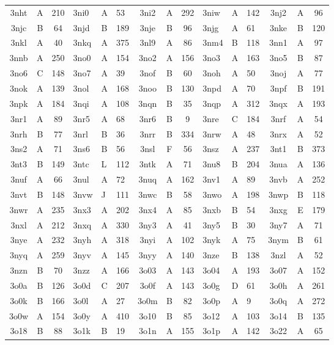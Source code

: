\begin{longtable}{|c|c|c| a|a|a| c|c|c| a|a|a| c|c|c|}
3nht & A & 210 & 3ni0 & A & 53 & 3ni2 & A & 292 & 3niw & A & 142 & 3nj2 & A & 96\\
3njc & B & 64 & 3njd & B & 189 & 3nje & B & 96 & 3njg & A & 61 & 3nke & B & 120\\
3nkl & A & 40 & 3nkq & A & 375 & 3nl9 & A & 86 & 3nm4 & B & 118 & 3nn1 & A & 97\\
3nnb & A & 250 & 3no0 & A & 154 & 3no2 & A & 156 & 3no3 & A & 163 & 3no5 & B & 87\\
3no6 & C & 148 & 3no7 & A & 39 & 3nof & B & 60 & 3noh & A & 50 & 3noj & A & 77\\
3nok & A & 139 & 3nol & A & 168 & 3noo & B & 130 & 3npd & A & 70 & 3npf & B & 191\\
3npk & A & 184 & 3nqi & A & 108 & 3nqn & B & 35 & 3nqp & A & 312 & 3nqx & A & 193\\
3nr1 & A & 89 & 3nr5 & A & 68 & 3nr6 & B & 9 & 3nre & C & 184 & 3nrf & A & 54\\
3nrh & B & 77 & 3nrl & B & 36 & 3nrr & B & 334 & 3nrw & A & 48 & 3nrx & A & 52\\
3ns2 & A & 71 & 3ns6 & B & 56 & 3nsl & F & 56 & 3nsz & A & 237 & 3nt1 & B & 373\\
3nt3 & B & 149 & 3ntc & L & 112 & 3ntk & A & 71 & 3nu8 & B & 204 & 3nua & A & 136\\
3nuf & A & 66 & 3nul & A & 72 & 3nuq & A & 162 & 3nv1 & A & 89 & 3nvb & A & 252\\
3nvt & B & 148 & 3nvw & J & 111 & 3nwc & B & 58 & 3nwo & A & 198 & 3nwp & B & 118\\
3nwr & A & 235 & 3nx3 & A & 202 & 3nx4 & A & 85 & 3nxb & B & 54 & 3nxg & E & 179\\
3nxl & A & 212 & 3nxq & A & 330 & 3ny3 & A & 41 & 3ny5 & B & 30 & 3ny7 & A & 71\\
3nye & A & 232 & 3nyh & A & 318 & 3nyi & A & 102 & 3nyk & A & 75 & 3nym & B & 61\\
3nyq & A & 259 & 3nyv & A & 145 & 3nyy & A & 140 & 3nze & B & 138 & 3nzl & A & 52\\
3nzn & B & 70 & 3nzz & A & 166 & 3o03 & A & 143 & 3o04 & A & 193 & 3o07 & A & 152\\
3o0a & B & 126 & 3o0d & C & 207 & 3o0f & A & 143 & 3o0g & D & 61 & 3o0h & A & 261\\
3o0k & B & 166 & 3o0l & A & 27 & 3o0m & B & 82 & 3o0p & A & 9 & 3o0q & A & 272\\
3o0w & A & 154 & 3o0y & A & 410 & 3o10 & B & 85 & 3o12 & A & 103 & 3o14 & B & 135\\
3o18 & B & 88 & 3o1k & B & 19 & 3o1n & A & 155 & 3o1p & A & 142 & 3o22 & A & 65\\

\end{longtable}
